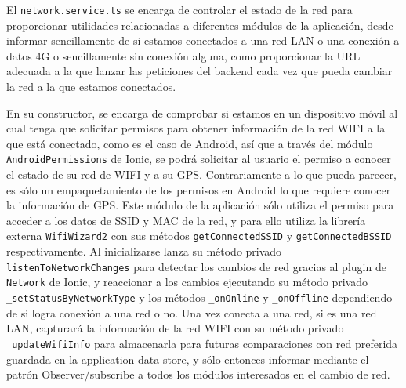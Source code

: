 \vspace{1cm}

El \verb|network.service.ts| se encarga de controlar el estado de la red para proporcionar utilidades relacionadas a diferentes módulos de la aplicación, desde informar sencillamente de si estamos conectados a una red LAN o  una conexión a datos 4G o sencillamente sin conexión alguna, como proporcionar la URL adecuada a la que lanzar las peticiones del backend cada vez que pueda cambiar la red a la que estamos conectados.

\vspace{0.5cm}

En su constructor, se encarga de comprobar si estamos en un dispositivo móvil al cual tenga que solicitar permisos para obtener información de la red WIFI a la que está conectado, como es el caso de Android, así que a través del módulo \verb|AndroidPermissions| de Ionic, se podrá solicitar al usuario el permiso a conocer el estado de su red de WIFI y a su GPS. Contrariamente a lo que pueda parecer, es sólo un empaquetamiento de los permisos en Android lo que requiere conocer la información de GPS. Este módulo de la aplicación sólo utiliza el permiso para acceder a los datos de SSID y MAC de la red, y para ello utiliza la librería externa \verb|WifiWizard2| con sus métodos \verb|getConnectedSSID| y \verb|getConnectedBSSID| respectivamente.
Al inicializarse lanza su método privado \verb|listenToNetworkChanges| para detectar los cambios de red gracias al plugin de \verb|Network| de Ionic, y reaccionar a los cambios ejecutando su método privado \verb|_setStatusByNetworkType| y los métodos \verb|_onOnline| y \verb|_onOffline| dependiendo de si logra conexión a una red o no. Una vez conecta a una red, si es una red LAN, capturará la información de la red WIFI con su método privado \verb|_updateWifiInfo| para almacenarla para futuras comparaciones con red preferida guardada en la application data store, y sólo entonces informar mediante el patrón Observer/subscribe a todos los módulos interesados en el cambio de red.

\vspace{0.5cm}

